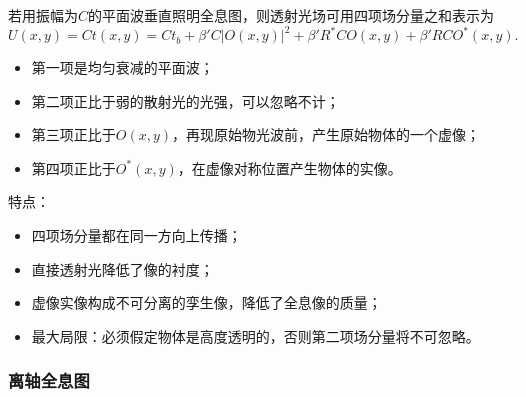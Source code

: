 \documentclass[UTF8]{ctexart}
\begin{document}
若用振幅为$C$的平面波垂直照明全息图，则透射光场可用四项场分量之和表示为
\begin{equation}
    U\left( x,y \right) = Ct\left( x,y \right) = Ct_b
     + \beta'C\left|O\left( x,y \right)\right|^2 + \beta'R^*CO\left( x,y \right) + \beta'RCO^*\left( x,y \right).
\end{equation}
\begin{itemize}
    \item 第一项是均匀衰减的平面波；
    \item 第二项正比于弱的散射光的光强，可以忽略不计；
    \item 第三项正比于$O\left( x,y \right)$，再现原始物光波前，产生原始物体的一个虚像；
    \item 第四项正比于$O^*\left( x,y \right)$，在虚像对称位置产生物体的实像。
\end{itemize}
特点：
\begin{itemize}
    \item 四项场分量都在同一方向上传播；
    \item 直接透射光降低了像的衬度；
    \item 虚像实像构成不可分离的孪生像，降低了全息像的质量；
    \item 最大局限：必须假定物体是高度透明的，否则第二项场分量将不可忽略。
\end{itemize}

\subsubsection{离轴全息图}
\end{document}
